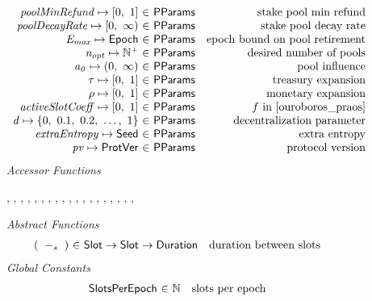 \begin{figure*}[htb]
\begin{equation*}
\begin{array}{r@{~\in~}lr}
        \var{poolMinRefund} \mapsto \unitInterval & \PParams & \text{stake pool min refund}\\
        \var{poolDecayRate} \mapsto \nonnegReals & \PParams & \text{stake pool decay rate}\\
        \var{E_{max}} \mapsto \Epoch & \PParams & \text{epoch bound on pool retirement}\\
        \var{n_{opt}} \mapsto \Npos & \PParams & \text{desired number of pools}\\
        \var{a_0} \mapsto \posReals & \PParams & \text{pool influence}\\
        \tau \mapsto \unitInterval & \PParams & \text{treasury expansion}\\
        \rho \mapsto \unitInterval & \PParams & \text{monetary expansion}\\
        \var{activeSlotCoeff} \mapsto \unitInterval & \PParams & f\text{ in \cite{ouroboros_praos}}\\
        \var{d} \mapsto \{0,~0.1,~0.2,~\ldots,~1\} & \PParams & \text{decentralization parameter}\\
        \var{extraEntropy} \mapsto \Seed & \PParams & \text{extra entropy}\\
        \var{pv} \mapsto \ProtVer & \PParams & \text{protocol version}\\
      \end{array}
  \end{equation*}
  \emph{Accessor Functions}
  \begin{center}
    ,
    ,
    ,
    ,
    ,
    ,
    ,
    ,
    ,
    ,
    ,
    ,
    ,
    ,
    ,
    ,
    ,
    ,
    ,
  \end{center}
  \emph{Abstract Functions}
  \begin{equation*}
    \begin{array}{r@{~\in~}lr}
      (\slotminus{}{}) & \Slot \to \Slot \to \Duration
                       & \text{duration between slots}
    \end{array}
  \end{equation*}
  \emph{Global Constants}
  \begin{equation*}
    \begin{array}{r@{~\in~}lr}
      \SlotsPerEpoch & \N & \text{slots per epoch} \\

\end{array}
\end{equation*}
\end{figure*}
